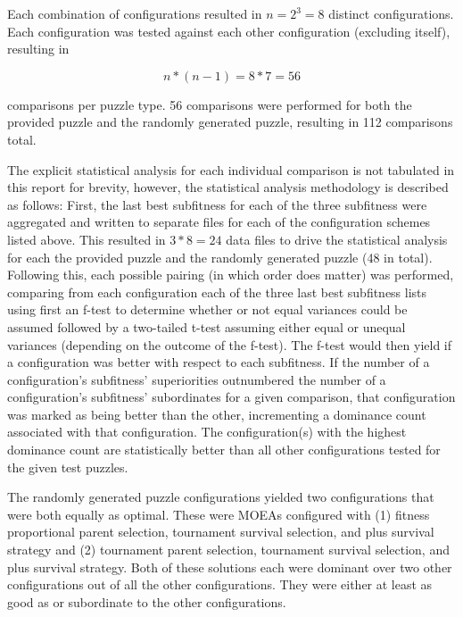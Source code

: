 \documentclass[11pt]{article}
\begin{document}
Each combination of configurations resulted in \begin{math} n = 2^3 = 8 \end{math} distinct configurations. Each configuration
was tested against each other configuration (excluding itself), resulting in  

\[ n * (n - 1) = 8 * 7 = 56 \]

comparisons per puzzle type. 56 comparisons were performed for both the provided puzzle and the randomly generated puzzle, 
resulting in 112 comparisons total.

The explicit statistical analysis for each individual comparison is not tabulated in this report for brevity, however, the statistical analysis
methodology is described as follows: First, the last best subfitness for each of the three subfitness were aggregated and written to separate 
files for each of the configuration schemes listed above. This resulted in \begin{math} 3 * 8 = 24 \end{math} data files
to drive the statistical analysis for each the provided puzzle and the randomly generated puzzle (48 in total).
Following this, each possible pairing (in which order does matter) was performed, 
comparing from each configuration each of the three last best subfitness lists using first an f-test to determine whether or not equal
variances could be assumed followed by a two-tailed t-test assuming either equal or unequal variances (depending on the 
outcome of the f-test). The f-test would then yield if a configuration was better with respect to each subfitness.
If the number of a configuration's subfitness' superiorities outnumbered the number of a configuration's subfitness'
subordinates for a given comparison, that configuration was marked as being better than the other, incrementing a 
dominance count associated with that configuration. The configuration(s) with the highest dominance count are statistically
better than all other configurations tested for the given test puzzles.

The randomly generated puzzle configurations yielded two configurations that were both equally as optimal. These were MOEAs configured 
with (1) fitness proportional parent selection, tournament survival selection, and plus survival strategy and (2) tournament parent
selection, tournament survival selection, and plus survival strategy. Both of these solutions each were dominant over two other configurations
out of all the other configurations. They were either at least as good as or subordinate to the other configurations.
\end{document}
